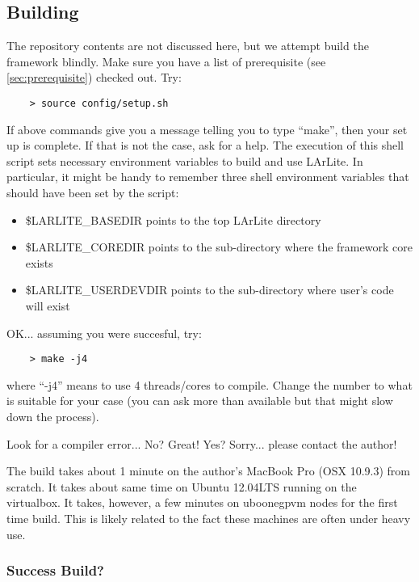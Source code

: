 
\subsection{Building \Core}

The repository contents are not discussed here, but we attempt build the framework blindly.
Make sure you have a list of prerequisite (see \ref{sec:prerequisite}) checked out.
Try:
\begin{lstlisting}
    > source config/setup.sh
\end{lstlisting}

If above commands give you a message telling you to type ``make'', then your set up is complete.
If that is not the case, ask for a help. The execution of this shell script sets necessary
environment variables to build and use LArLite. In particular, it might be handy to remember three
shell environment variables that should have been set by the script:
\begin{itemize}
   \item {\ttfamily \$LARLITE\_BASEDIR} points to the top LArLite directory
   \item {\ttfamily \$LARLITE\_COREDIR} points to the \Core sub-directory where the framework core exists
   \item {\ttfamily \$LARLITE\_USERDEVDIR} points to the \UserDev sub-directory where user's code will exist
\end{itemize}

OK... assuming you were succesful, try:
\begin{lstlisting}
    > make -j4
\end{lstlisting}

where ``-j4'' means to use 4 threads/cores to compile. 
Change the number to what is suitable for your case (you can ask more than available but that might slow down the process).

Look for a compiler error... No? Great! Yes? Sorry... please contact the author!

The build takes about 1 minute on the author's MacBook Pro (OSX 10.9.3) from scratch. 
It takes about same time on Ubuntu 12.04LTS running on the virtualbox. 
It takes, however, a few minutes on uboonegpvm nodes for the first time build.
This is likely related to the fact these machines are often under heavy use.

\subsubsection{Success Build?}

